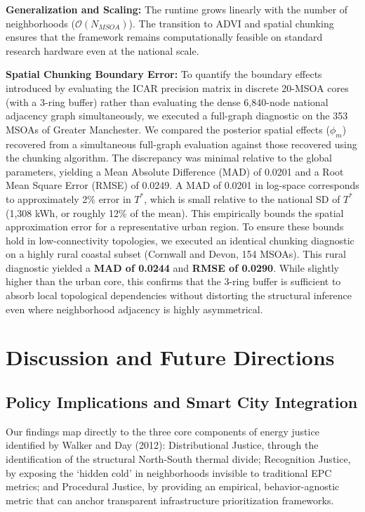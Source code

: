 \documentclass[11pt, a4paper, twocolumn]{article}
\begin{document}
\textbf{Generalization and Scaling:} The runtime grows linearly with the 
number of neighborhoods (\(\mathcal{O}(N_{MSOA})\)). The transition to 
ADVI and spatial chunking ensures that the framework remains computationally 
feasible on standard research hardware even at the national scale.

\textbf{Spatial Chunking Boundary Error:} To quantify the boundary effects 
introduced by evaluating the ICAR precision matrix in discrete 20-MSOA cores 
(with a 3-ring buffer) rather than evaluating the dense 6,840-node national 
adjacency graph simultaneously, we executed a full-graph diagnostic on the 
353 MSOAs of Greater Manchester. We compared the posterior spatial effects 
(\(\phi_m\)) recovered from a simultaneous full-graph evaluation against 
those recovered using the chunking algorithm. The discrepancy was minimal relative 
to the global parameters, yielding a Mean Absolute Difference (MAD) of 0.0201 
and a Root Mean Square Error (RMSE) of 0.0249. A MAD of 0.0201 in log-space 
corresponds to approximately 2\% error in $T^*$, which is small relative to the 
national SD of $T^*$ (1,308 kWh, or roughly 12\% of the mean). This empirically 
bounds the spatial approximation error for a representative urban region. To ensure these bounds hold in low-connectivity topologies, we executed an identical chunking diagnostic on a highly rural coastal subset (Cornwall and Devon, 154 MSOAs). This rural diagnostic yielded a \textbf{MAD of 0.0244} and \textbf{RMSE of 0.0290}. While slightly higher than the urban core, this confirms that the 3-ring buffer is sufficient to absorb local topological dependencies without distorting the structural inference even where neighborhood adjacency is highly asymmetrical.

\section{Discussion and Future
Directions}\label{discussion-and-future-directions}

\subsection{Policy Implications and Smart City
Integration}\label{policy-implications-and-smart-city-integration}

Our findings map directly to the three core components of energy justice identified by Walker and Day (2012): Distributional Justice, through the identification of the structural North-South thermal divide; Recognition Justice, by exposing the `hidden cold' in neighborhoods invisible to traditional EPC metrics; and Procedural Justice, by providing an empirical, behavior-agnostic metric that can anchor transparent infrastructure prioritization frameworks.
\end{document}
